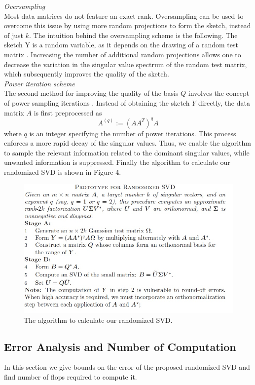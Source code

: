 \documentclass[a4paper,10pt]{article}
\begin{document}
\textit{Oversampling}\\ 
Most data matrices do not feature an exact rank. Oversampling can be used to overcome this issue by using more random projections to form the sketch, instead of just $k$. The intuition behind the oversampling scheme is the following. The sketch Y is a random variable, as it depends on the drawing of a random test matrix 
. Increasing the number of additional random projections allows one to decrease the variation in the singular value spectrum of the random test matrix, which subsequently improves the quality of the sketch.\\

\textit{Power iteration scheme}\\
The second method for improving the quality of the basis $Q$ involves the concept of power sampling iterations . Instead of obtaining the sketch $Y$ directly, the data matrix $A$ is first preprocessed as
\begin{equation}
A^{(q)} := (AA^T)^q A
\end{equation}
where $q$ is an integer specifying the number of power iterations. This process enforces a more rapid decay of the singular values. Thus, we enable the algorithm to sample the relevant information related to the dominant singular values, while unwanted information is suppressed. Finally the algorithm to calculate our randomized SVD is shown in Figure 4.

\begin{figure}
	\includegraphics[scale=0.4]{fig4.jpg}
	\caption{The algorithm to calculate our randomized SVD.}
	\label{fig3}
\end{figure}

\subsection{Error Analysis and Number of Computation}
In this section we give bounds on the error of the proposed randomized SVD and find number of flops required to compute it.
\end{document}
